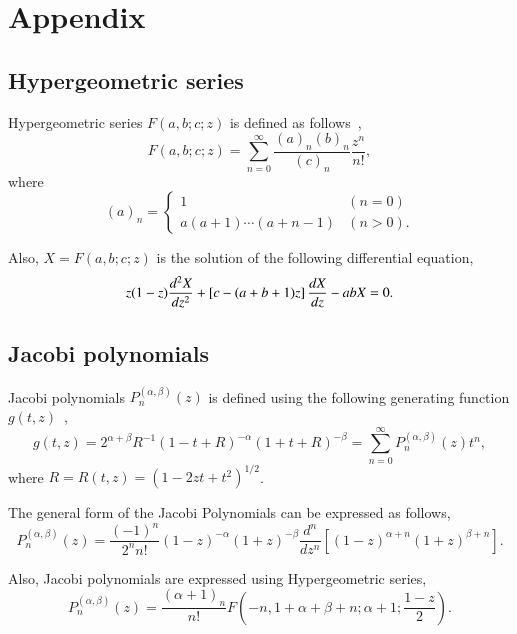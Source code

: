 \documentclass{article}
\begin{document}
\section{Appendix}
\subsection{Hypergeometric series}
Hypergeometric series $F(a,b;c;z)$ is defined as follows~\cite{olver2010nist},
\begin{equation}
 F(a,b;c;z) = \sum_{n=0}^{\infty} \frac{(a)_n (b)_n}{(c)_n}\frac{z^n}{n!},
\end{equation}
where
\begin{equation}
 (a)_n = \begin{cases}
          1 & (n=0)\\
          a (a+1) \cdots (a+n-1)& (n>0).
         \end{cases}
\end{equation}

Also, $X = F(a,b;c;z)$ is the solution of the following differential equation,
\begin{equation}
 z(1-z)\frac{d^2 X}{d z^2} + \left[ c - (a+b+1)z \right] \frac{d {X}}{d {z}} - ab X = 0.\label{hypgeo_concrete}
\end{equation}

\subsection{Jacobi polynomials}
Jacobi polynomials $P^{(\alpha,\beta)}_{n} (z)$ is defined using the following generating function $g(t,z)$~\cite{olver2010nist},
\begin{equation}
 g(t,z) = 2^{\alpha+\beta} R^{-1} (1-t+R)^{-\alpha} (1+t+R)^{-\beta} = \sum_{n=0}^{\infty} P^{(\alpha,\beta)}_{n} (z) t^n,
\end{equation}
where $R = R(t,z) = \left(1 - 2zt + t^2\right)^{1/2}$.

The general form of the Jacobi Polynomials can be expressed as follows,
\begin{equation}
 P^{(\alpha, \beta)}_n (z) = \frac{(-1)^n}{2^n n!} (1-z)^{-\alpha} (1+z)^{-\beta} \frac{d^n}{dz^n}\left[(1-z)^{\alpha+n} (1+z)^{\beta+n}\right].
\end{equation}

Also, Jacobi polynomials are expressed using Hypergeometric series,
\begin{equation}
 P^{(\alpha,\beta)}_{n} (z) = \frac{(\alpha+1)_n}{n!} F \left(-n, 1+\alpha+\beta+n; \alpha+1; \frac{1-z}{2}\right).
\end{equation}
\end{document}
